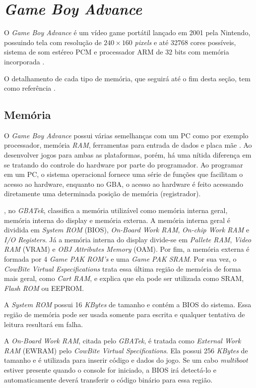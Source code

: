 \section{\textit{Game Boy Advance}} \label{gba}

  O \textit{Game Boy Advance} é um vídeo game portátil lançado em 2001 pela Nintendo, possuindo tela com resolução de $240\times160$ \textit{pixels} e até 32768 cores possíveis, sistema de som estéreo PCM e processador ARM de 32 bits com memória incorporada \cite{nintendo}.

  O detalhamento de cada tipo de memória, que seguirá até o fim desta seção, tem como referência \cite{cowbite}.

  \subsection{Memória} \label{gba-memory}

    O \textit{Game Boy Advance} possui várias semelhanças com um PC como por exemplo processador, memória \textit{RAM}, ferramentas para entrada de dados e placa mãe \cite{harbour}. Ao desenvolver jogos para ambas as plataformas, porém, há uma nítida diferença em se tratando do controle do hardware por parte do programador. Ao programar em um PC, o sistema operacional fornece uma série de funções que facilitam o acesso ao hardware, enquanto no GBA, o acesso ao hardware é feito acessando diretamente uma determinada posição de memória (registrador).

    , no \textit{GBATek}, classifica a memória utilizável como memória interna geral, memória interna do display e memória externa. A memória interna geral é dividida em \textit{System ROM} (BIOS), \textit{On-Board Work RAM}, \textit{On-chip Work RAM} e \textit{I/O Registers}. Já a memória interna do display divide-se em \textit{Pallete RAM}, \textit{Video RAM} (VRAM) e \textit{OBJ Attributes Memory} (OAM). Por fim, a memória externa é formada por 4 \textit{Game PAK ROM's} e uma \textit{Game PAK SRAM}. Por sua vez, o \textit{CowBite Virtual Especifications} trata essa última região de memória de forma mais geral, como \textit{Cart RAM}, e explica que ela pode ser utilizada como SRAM, \textit{Flash ROM} ou EEPROM.

    A \textit{System ROM} possui 16 \textit{KBytes} de tamanho e contém a BIOS do sistema. Essa região de memória pode ser usada somente para escrita e qualquer tentativa de leitura resultará em falha.

    A \textit{On-Board Work RAM}, citada pelo \textit{GBATek}, é tratada como \textit{External Work RAM} (EWRAM) pelo \textit{CowBite Virtual Specifications}. Ela possui 256 \textit{KBytes} de tamanho e é utilizada para inserir código e dados do jogo. Se um cabo \textit{multiboot} estiver presente quando o console for iniciado, a BIOS irá detectá-lo e automaticamente deverá transferir o código binário para essa região.

